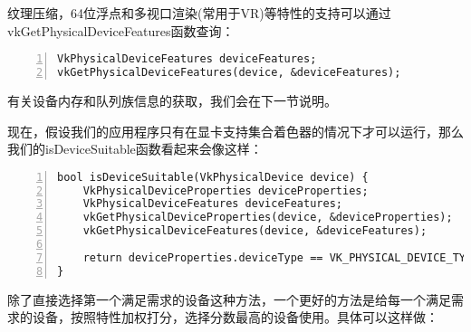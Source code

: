 \documentclass{ctexart}
\begin{document}
纹理压缩，64位浮点和多视口渲染(常用于VR)等特性的支持可以通过vkGetPhysicalDeviceFeatures函数查询：

\begin{lstlisting}[language={[ANSI]C},keywordstyle=\color{blue!70},commentstyle=\color{red!50!green!50!blue!50},frame=shadowbox, rulesepcolor=\color{red!20!green!20!blue!20},basicstyle=\small,numbers=left, numberstyle=\tiny,breaklines=true]
VkPhysicalDeviceFeatures deviceFeatures;
vkGetPhysicalDeviceFeatures(device, &deviceFeatures);
\end{lstlisting}

有关设备内存和队列族信息的获取，我们会在下一节说明。

现在，假设我们的应用程序只有在显卡支持集合着色器的情况下才可以运行，那么我们的isDeviceSuitable函数看起来会像这样：

\begin{lstlisting}[language={[ANSI]C},keywordstyle=\color{blue!70},commentstyle=\color{red!50!green!50!blue!50},frame=shadowbox, rulesepcolor=\color{red!20!green!20!blue!20},basicstyle=\small,numbers=left, numberstyle=\tiny,breaklines=true]
bool isDeviceSuitable(VkPhysicalDevice device) {
	VkPhysicalDeviceProperties deviceProperties;
	VkPhysicalDeviceFeatures deviceFeatures;
	vkGetPhysicalDeviceProperties(device, &deviceProperties);
	vkGetPhysicalDeviceFeatures(device, &deviceFeatures);

	return deviceProperties.deviceType == VK_PHYSICAL_DEVICE_TYPE_DISCRETE_GPU && deviceFeatures.geometryShader;
}
\end{lstlisting}

除了直接选择第一个满足需求的设备这种方法，一个更好的方法是给每一个满足需求的设备，按照特性加权打分，选择分数最高的设备使用。具体可以这样做：
\end{document}
